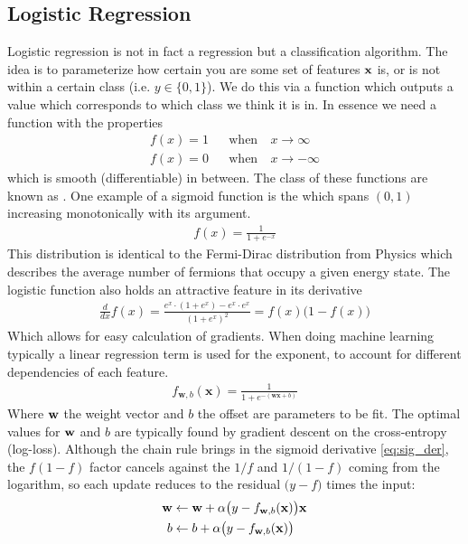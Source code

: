 \subsection{Logistic Regression}
Logistic regression is not in fact a regression but a classification algorithm. The idea is to parameterize how certain you are some set of features $\textbf{x}$ is, or is not within a certain class (i.e. $y\in \{0,1\}$). We do this via a function which outputs a value which corresponds to which class we think it is in. In essence we need a function with the properties
\begin{align}
    f(x)=1 &&\textrm{when}&~ x\rightarrow\infty\\
    f(x)=0 &&\textrm{when}&~ x\rightarrow-\infty
\end{align}
which is smooth (differentiable) in between. The class of these functions are known as .  One example of a sigmoid function is the  which spans $(0,1)$ increasing monotonically with its argument.
\begin{align}
	f(x) = \frac{1}{1+e^{-x}}
\end{align}
This distribution is identical to the Fermi-Dirac distribution from Physics which describes the average number of fermions that occupy a given energy state. The logistic function also holds an attractive feature in its derivative
\begin{align}\label{eq:sig_der}
    \frac{d}{dx}f(x) = \frac{e^x\cdot(1+e^x)-e^x\cdot e^x}{(1+e^x)^2} = f(x)\Big(1-f(x)\Big)
\end{align}
Which allows for easy calculation of gradients. When doing machine learning typically a linear regression term is used for the exponent, to account for different dependencies of each feature.
\begin{align}
	f_{\mathbf{w},b}(\mathbf{x}) = \frac{1}{1+e^{-(\mathbf{wx} +b)}}
\end{align}
Where $\textbf{w}$ the weight vector and $b$ the offset are parameters to be fit. The optimal values for $\textbf{w}$ and $b$ are typically found by gradient descent on the cross-entropy (log-loss). Although the chain rule brings in the sigmoid derivative \eqref{eq:sig_der}, the $f(1-f)$ factor cancels against the $1/f$ and $1/(1-f)$ coming from the logarithm, so each update reduces to the residual $\big(y-f\big)$ times the input:
\begin{align}
    \textbf{w}&\leftarrow\textbf{w}+\alpha\big(y-f_{\mathbf{w},b}(\mathbf{x})\big)\textbf{x}\\
    b&\leftarrow b +\alpha\big(y-f_{\mathbf{w},b}(\mathbf{x})\big)
\end{align}


